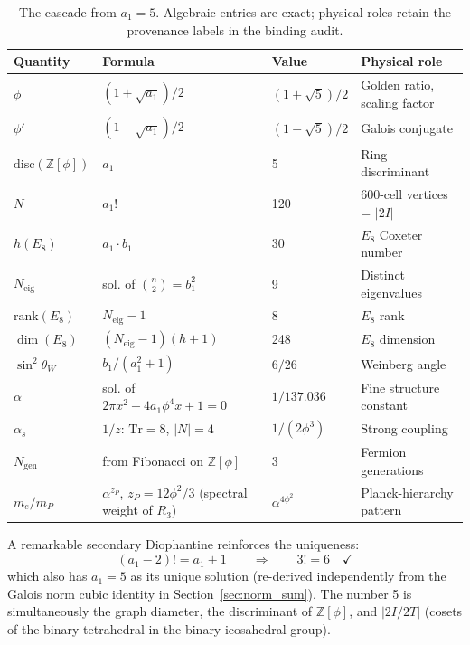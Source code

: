 \documentclass[12pt,a4paper]{article}
\theoremstyle{definition}
\begin{document}
\begin{table}[H]
\centering
\begin{tabular}{llll}
\toprule
\textbf{Quantity} & \textbf{Formula} & \textbf{Value} & \textbf{Physical role} \\
\midrule
$\phi$ & $(1 + \sqrt{a_1})/2$ & $(1+\sqrt{5})/2$ & Golden ratio, scaling factor \\
$\phi'$ & $(1 - \sqrt{a_1})/2$ & $(1-\sqrt{5})/2$ & Galois conjugate \\
$\text{disc}(\mathbb{Z}[\phi])$ & $a_1$ & 5 & Ring discriminant \\
$N$ & $a_1!$ & 120 & 600-cell vertices = $|2I|$ \\
$h(E_8)$ & $a_1 \cdot b_1$ & 30 & $E_8$ Coxeter number \\
$N_{\text{eig}}$ & sol. of $\binom{n}{2} = b_1^2$ & 9 & Distinct eigenvalues \\
$\text{rank}(E_8)$ & $N_{\text{eig}} - 1$ & 8 & $E_8$ rank \\
$\dim(E_8)$ & $(N_{\text{eig}}-1)(h+1)$ & 248 & $E_8$ dimension \\
$\sin^2\theta_W$ & $b_1/(a_1^2+1)$ & $6/26$ & Weinberg angle \\
$\alpha$ & sol. of $2\pi x^2 - 4a_1\phi^4 x + 1 = 0$ & $1/137.036$ & Fine structure constant \\
$\alpha_s$ & $1/z$: $\text{Tr}=8$, $|N|=4$ & $1/(2\phi^3)$ & Strong coupling \\
$N_{\text{gen}}$ & from Fibonacci on $\mathbb{Z}[\phi]$ & 3 & Fermion generations \\
$m_e/m_P$ & $\alpha^{z_P}$, $z_P = 12\phi^2/3$ (spectral weight of $R_3$) & $\alpha^{4\phi^2}$ & Planck-hierarchy pattern \\
\bottomrule
\end{tabular}
\caption{The cascade from $a_1=5$.  Algebraic entries are exact; physical roles retain the provenance labels in the binding audit.}
\label{tab:cascade}
\end{table}

A remarkable secondary Diophantine reinforces the uniqueness:
\begin{equation}
(a_1 - 2)! = a_1 + 1 \qquad \Longrightarrow \qquad 3! = 6 \quad \checkmark
\label{eq:secondary_dioph}
\end{equation}
which also has $a_1 = 5$ as its unique solution (re-derived independently from the Galois norm cubic identity in Section~\ref{sec:norm_sum}). The number 5 is simultaneously the graph diameter, the discriminant of $\mathbb{Z}[\phi]$, and $|2I/2T|$ (cosets of the binary tetrahedral in the binary icosahedral group).
\end{document}
